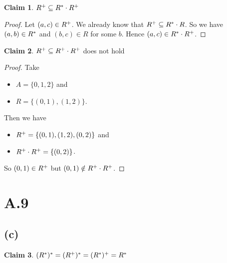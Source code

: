 \documentclass[autodetect-enginem]{article}
\theoremstyle{plain}
\theoremstyle{definition}
\theoremstyle{definition}
\newtheorem*{claim}{Claim}
\begin{document}
\begin{claim}
    $R^{+} \subseteq R^{*} \cdot R^{+}$
\end{claim}

\begin{proof}
    Let $(a,c) \in R^{+}$.
    We already know that $R^{+} \subseteq R^{*} \cdot R$.
    So we have $(a,b) \in R^{*}$ and $(b,c) \in R$ for some $b$.
    Hence $(a,c) \in R^{*} \cdot R^{+}$.

\end{proof}

\begin{claim}
    $R^{+} \subseteq R^{+} \cdot R^{+}$ does not hold
\end{claim}

\begin{proof}
    Take
    \begin{itemize}
        \item $A = \{0,1,2\}$ and
        \item $R = \{(0,1),(1,2)\}$.
    \end{itemize}
    Then we have
    \begin{itemize}
        \item $R^{+} = \{(0,1),(1,2),(0,2)\}$ and
        \item $R^{+} \cdot R^{+} = \{(0,2)\}$.
    \end{itemize}
    So $(0,1) \in R^{+}$ but $(0,1) \notin R^{+} \cdot R^{+}$.
\end{proof}

\section*{A.9}
\subsection*{(c)}
\begin{claim}
    $(R^{*})^{*} = (R^{+})^{*} = (R^{*})^{+} = R^{*}$
\end{claim}
\end{document}
